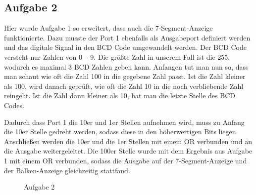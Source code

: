 \documentclass[a4paper,11pt]{article}
\begin{document}
\subsection{Aufgabe 2}
Hier wurde Aufgabe 1 so erweitert, dass auch die 7-Segment-Anzeige funktionierte. 
Dazu musste der Port 1 ebenfalls als Ausgabeport definiert werden und das digitale Signal in den BCD Code umgewandelt werden. 
Der BCD Code versteht nur Zahlen von 0 – 9. Die größte Zahl in unserem Fall ist die 255, wodurch es maximal 3 BCD Zahlen geben kann. 
Anfangen tut man nun so, dass man schaut wie oft die Zahl 100 in die gegebene Zahl passt. 
Ist die Zahl kleiner als 100, wird danach geprüft, wie oft die Zahl 10 in die noch verbliebende Zahl reingeht. Ist die Zahl dann kleiner als 10, hat man die letzte Stelle des BCD Codes. 

Dadurch dass Port 1 die 10er und 1er Stellen aufnehmen wird, muss zu Anfang die 10er Stelle gedreht werden, sodass diese in den höherwertigen Bits liegen. Anschließen werden die 10er und die 1er Stellen mit einem OR verbunden und an die Ausgabe weitergeleitet. 
Die 100er Stelle wurde mit dem Ergebnis aus Aufgabe 1 mit einem OR verbunden, sodass die Ausgabe auf der 7-Segment-Anzeige und der Balken-Anzeige gleichzeitig stattfand. 

\begin{figure}[p]
\begin{center}

\caption{Aufgabe 2}
\end{center}
\end{figure}
\end{document}
